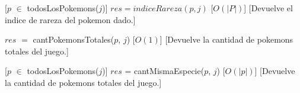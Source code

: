 \begin{Interfaz}
%
[$p$ $\in$ todosLosPokemons($j$)] 
{$res = indiceRareza(p, j)$}  %
[$O(|P|)$] %
[Devuelve el indice de rareza del pokemon dado.]


%
{$res$ $=$ cantPokemonsTotales($p$, $j$)}  %
[$O(1)$] %
[Devuelve la cantidad de pokemons totales del juego.]



[$p$ $\in$ todosLosPokemons($j$)] 
{$res$ = cantMismaEspecie($p$, $j$)}  %
[$O(|p|)$] %
[Devuelve la cantidad de pokemons totales del juego.]


\end{Interfaz}

~ 

